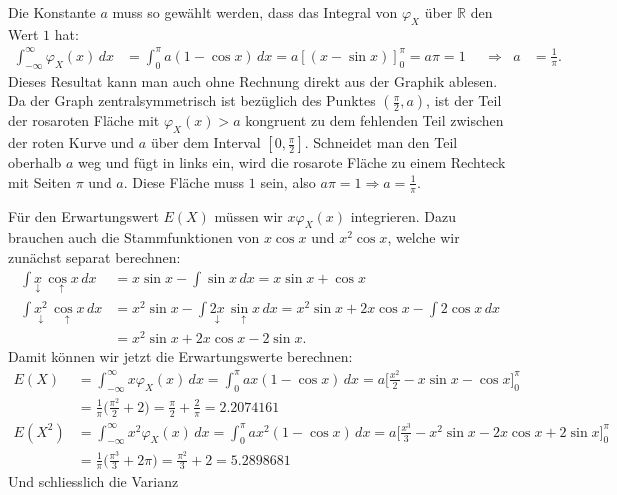 \begin{loesung}
\begin{teilaufgaben}
\item
Die Konstante $a$ muss so gewählt werden, dass das Integral von $\varphi_X$
über $\mathbb R$ den Wert $1$ hat:
\begin{align*}
\int_{-\infty}^{\infty}\varphi_X(x)\,dx
&=
\int_0^\pi a(1-\cos x)\,dx
=
a\left[
(x-\sin x)
\right]_0^\pi
=a\pi= 1
&&\Rightarrow&a&=\frac1{\pi}.
\end{align*}
Dieses Resultat kann man auch ohne Rechnung direkt aus der Graphik
ablesen.
Da der Graph zentralsymmetrisch ist bezüglich des Punktes $(\frac{\pi}2,a)$,
ist der Teil der rosaroten Fläche mit $\varphi_X(x)>a$ kongruent
zu dem fehlenden Teil zwischen der roten Kurve und $a$ über dem
Interval $[0,\frac{\pi}2]$.
Schneidet man den Teil oberhalb $a$ weg und fügt in links ein, wird
die rosarote Fläche zu einem Rechteck mit Seiten $\pi$ und $a$.
Diese Fläche muss $1$ sein, also $a\pi=1\Rightarrow a=\frac1{\pi}$.
\item
Für den Erwartungswert $E(X)$ müssen wir $x\varphi_X(x)$ integrieren.
Dazu brauchen auch die Stammfunktionen von $x\cos x$ und $x^2\cos x$,
welche wir zunächst separat berechnen:
\begin{align*}
\int \underset{\displaystyle\downarrow}{x}\,\underset{\displaystyle\uparrow}{\cos x}\,dx
&=
x\sin x -\int \sin x\,dx
=
x\sin x +\cos x
\\
\int \underset{\displaystyle\downarrow}{x^2}\,\underset{\displaystyle\uparrow}{\cos x}\,dx
&=
x^2\sin x-\int \underset{\displaystyle\downarrow}{2x}\,\underset{\displaystyle\uparrow}{\sin x}\,dx
=
x^2\sin x+2x\cos x-\int 2\cos x\,dx
\\
&=
x^2\sin x+2x\cos x-2\sin x.
\end{align*}
Damit können wir jetzt die Erwartungswerte berechnen:
\begin{align*}
E(X)
&=
\int_{-\infty}^{\infty}x\varphi_X(x)\,dx
=
\int_0^\pi ax(1-\cos x)\,dx
=
a\biggl[\frac{x^2}2
-x\sin x-\cos x
\biggr]_0^\pi
\\
&=
\frac1{\pi}\biggl(
\frac{\pi^2}{2}+2
\biggr)
=
\frac{\pi}{2}+\frac{2}{\pi}=2.2074161
\\
E(X^2)
&=
\int_{-\infty}^{\infty}x^2\varphi_X(x)\,dx
=
\int_0^\pi ax^2(1-\cos x)\,dx
=
a\biggl[\frac{x^3}3
-x^2\sin x-2x\cos x +2\sin x
\biggr]_0^\pi
\\
&=
\frac1{\pi}\biggl(
\frac{\pi^3}{3} +2\pi
\biggr)
=\frac{\pi^2}{3}+2=5.2898681
\end{align*}
Und schliesslich die Varianz

\end{teilaufgaben}
\end{loesung}
